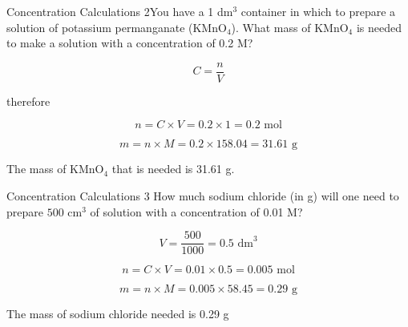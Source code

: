 \begin{wex}{Concentration Calculations 2}{You have a 1 dm$^{3}$ container in which to prepare a solution of potassium permanganate (KMnO$_{4}$). What mass of KMnO$_{4}$ is needed to make a solution with a concentration of 0.2 M?\\}
{

\begin{equation*}
C = \frac{n}{V}
\end{equation*}

therefore

\begin{equation*}
n = C \times V = 0.2 \times 1 = 0.2 \text{ mol}
\end{equation*}

\begin{equation*}
m = n \times M = 0.2 \times 158.04 = 31.61 \text{ g}
\end{equation*}

The mass of KMnO$_{4}$ that is needed is 31.61 g.
}
\end{wex}

\begin{wex}{Concentration Calculations 3}{
How much sodium chloride (in g) will one need to prepare $500 \text{ cm}^{3}$ of solution with a concentration of 0.01 M?\\}

{

\begin{equation*}
V = \frac{500}{1000} = 0.5 \text{ dm}^{3}
\end{equation*}

\begin{equation*}
n = C \times V = 0.01 \times 0.5 = 0.005 \text{ mol}
\end{equation*}

\begin{equation*}
m = n \times M = 0.005 \times 58.45 = 0.29 \text{ g}
\end{equation*}


The mass of sodium chloride needed is 0.29 g
}\end{wex}


